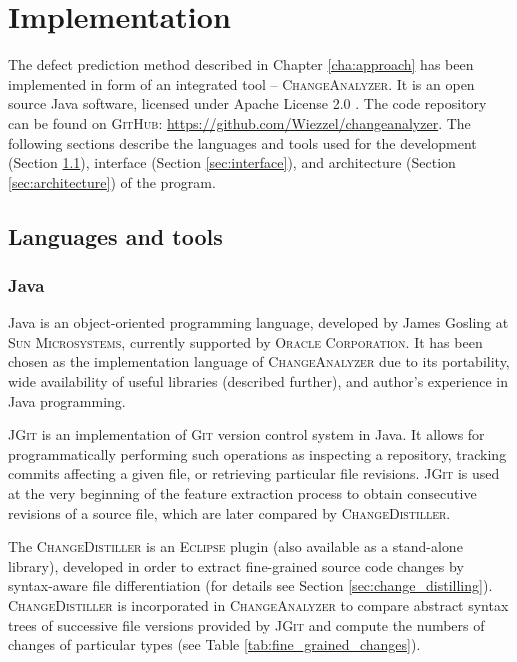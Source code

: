 \documentclass{pracamgr}
\newcommand{\ca}{\textsc{ChangeAnalyzer}\xspace}
\newenvironment{definition}[1]%
	{
		\medskip
		\begin{adjustwidth}{\parindent}{}
		\rlap{\textbf{#1}}\par\nobreak
	}
	{
		\end{adjustwidth}
	}
\begin{document}
\chapter{Implementation}
\label{cha:implementation}
The defect prediction method described in Chapter \ref{cha:approach} has been implemented in form of an integrated tool -- \ca. It is an open source Java software, licensed under Apache License 2.0 \cite{apache}. The code repository can be found on \textsc{GitHub}: \url{https://github.com/Wiezzel/changeanalyzer}. The following sections describe the languages and tools used for the development (Section \ref{sec:languagess}), interface (Section \ref{sec:interface}), and architecture (Section \ref{sec:architecture}) of the program.

\section{Languages and tools}
\label{sec:languagess}

\subsection{Java} 

Java \cite{java} is an object-oriented programming language, developed by James Gosling at \textsc{Sun Microsystems}, currently supported by \textsc{Oracle Corporation}. It has been chosen as the implementation language of \ca due to its portability, wide availability of useful libraries (described further), and author's experience in Java programming.

\begin{definition}{JGit}
\textsc{JGit} \cite{jgit} is an implementation of \textsc{Git} \cite{git} version control system in Java. It allows for programmatically performing such operations as inspecting a repository, tracking commits affecting a given file, or retrieving particular file revisions. \textsc{JGit} is used at the very beginning of the feature extraction process to obtain consecutive revisions of a source file, which are later compared by \textsc{ChangeDistiller}.
\end{definition}

\begin{definition}{ChangeDistiller}
The \textsc{ChangeDistiller} \cite{change_distilling} is an \textsc{Eclipse} plugin (also available as a stand-alone library), developed in order to extract fine-grained source code changes by syntax-aware file differentiation (for details see Section \ref{sec:change_distilling}). \textsc{ChangeDistiller} is incorporated in \ca to compare abstract syntax trees of successive file versions provided by \textsc{JGit} and compute the numbers of changes of particular types (see Table \ref{tab:fine_grained_changes}).
\end{definition}
\end{document}
